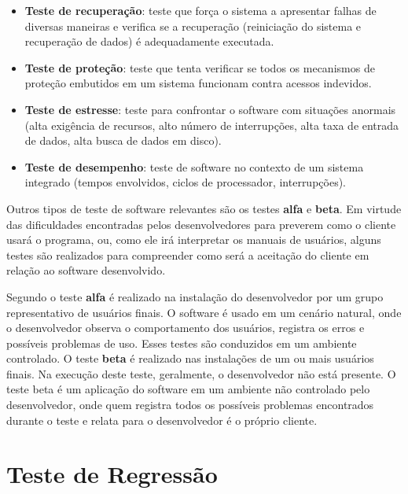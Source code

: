 \begin{itemize}
    
    \item \textbf{Teste de recuperação}: teste que força o sistema a apresentar falhas de diversas maneiras e verifica se a recuperação (reiniciação do sistema e recuperação de dados) é adequadamente executada.
    
    \item \textbf{Teste de proteção}: teste que tenta verificar se todos os mecanismos de proteção embutidos em um sistema funcionam contra acessos indevidos.
    
    \item \textbf{Teste de estresse}: teste para confrontar o software com situações anormais (alta exigência de recursos, alto número de interrupções, alta taxa de entrada de dados, alta busca de dados em disco).
    
    \item \textbf{Teste de desempenho}: teste de software no contexto de um sistema integrado (tempos envolvidos, ciclos de processador, interrupções).

\end{itemize}

Outros tipos de teste de software relevantes são os testes \textbf{alfa} e \textbf{beta}. Em virtude das dificuldades encontradas pelos desenvolvedores para preverem como o cliente usará o programa, ou, como ele irá interpretar os manuais de usuários, alguns testes são realizados para compreender como será a aceitação do cliente em relação ao software desenvolvido. 

Segundo  o teste \textbf{alfa} é realizado na instalação do desenvolvedor por um grupo representativo de usuários finais. O software é usado em um cenário natural, onde o desenvolvedor observa o comportamento dos usuários, registra os erros e possíveis problemas de uso. Esses testes são conduzidos em um ambiente controlado. O teste \textbf{beta} é realizado nas instalações de um ou mais usuários finais. Na execução deste teste, geralmente, o desenvolvedor não está presente. O teste beta é um aplicação do software em um ambiente não controlado pelo desenvolvedor, onde quem registra todos os possíveis problemas encontrados durante o teste e relata para o desenvolvedor é o próprio cliente.


\section{Teste de Regressão}\label{sec:testesregressao}

